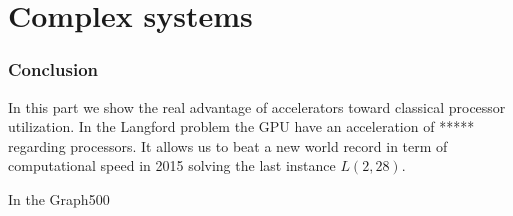 \part{Complex systems}










\section*{Conclusion}
In this part we show the real advantage of accelerators toward classical processor utilization. 
In the Langford problem the GPU have an acceleration of ***** regarding processors. 
It allows us to beat a new world record in term of computational speed in 2015 solving the last instance $L(2,28)$. 


In the Graph500